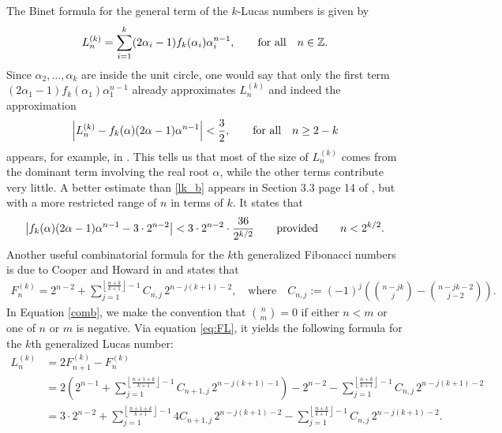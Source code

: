 \documentclass[11pt,a4paper]{article}
\numberwithin{equation}{section}
\numberwithin{table}{section}
\numberwithin{figure}{section}
\begin{document}
The Binet formula for the general term of the $k$-Lucas numbers is given by
\begin{equation*}
L_n^{(k)} = \sum_{i=1}^k (2\alpha_i - 1)f_k(\alpha_i)\alpha_i^{n - 1},\qquad {\text{\rm for all}}\quad n\in {\mathbb Z}.
\end{equation*}
Since $\alpha_2,\ldots,\alpha_k$ are inside the unit circle, one would say that only the first term $(2\alpha_1-1)f_k(\alpha_1)\alpha_1^{n-1}$ already approximates $L_n^{(k)}$ and indeed the approximation
\begin{align}\label{lk_b}
\left|L_n^{(k)} - f_k(\alpha)(2\alpha - 1)\alpha^{n - 1}\right| < \frac{3}{2},\qquad {\text{\rm for~all}}\quad n\ge 2-k
\end{align}
appears, for example, in \cite{BRL}. This tells us that most of the size of $L_n^{(k)}$ comes from the dominant term involving the real root $\alpha$, while the other terms contribute very little. A better estimate than \eqref{lk_b} appears in Section  3.3 page 14 of \cite{bat}, but with a more restricted range of $n$ in terms of $k$. It states that 
\begin{align}\label{lk_b1}
	\left| f_k(\alpha)(2\alpha - 1)\alpha^{n - 1}-3\cdot 2^{n-2}\right| < 3\cdot 2^{n-2}\cdot \frac{36}{2^{k/2}}\qquad {\text{\rm provided}}\qquad n<2^{k/2}.
\end{align}
Another useful combinatorial formula for the $k$th generalized Fibonacci numbers is  due to Cooper and Howard in \cite{cop} and states that
\begin{align}\label{comb}
F_n^{(k)} = 2^{n - 2} + \sum_{j = 1}^{\left\lfloor \frac{n + k}{k + 1} \right\rfloor - 1} C_{n, j} \, 2^{n - j(k+1) - 2}, \quad \text{where} \quad 
C_{n,j} := (-1)^j \left( \binom{n - jk}{j} - \binom{n - jk - 2}{j - 2} \right).
\end{align}
In Equation \eqref{comb}, we make the convention that $\displaystyle\binom{n}{m}=0$ if either $n<m$ or one of $n$ or $m$ is negative.
Via equation \eqref{eq:FL}, it yields the following formula for the $k$th generalized Lucas number:
 \begin{align}\label{2adic2}
	L_n^{(k)} &= 2F_{n+1}^{(k)}-F_n^{(k)}\nonumber\\
	&= 2\left(2^{n-1}+
	\sum_{j = 1}^{\left\lfloor \frac{n +1+ k}{k + 1} \right\rfloor - 1} C_{n+1, j} \, 2^{n - j(k+1) - 1}\right)-
	2^{n - 2} - \sum_{j = 1}^{\left\lfloor \frac{n + k}{k + 1} \right\rfloor - 1} C_{n, j} \, 2^{n - j(k+1) - 2}\nonumber\\
	&= 3\cdot2^{n-2}+
	\sum_{j = 1}^{\left\lfloor \frac{n +1+ k}{k + 1} \right\rfloor - 1}4 C_{n+1, j} \, 2^{n - j(k+1) -2}
	- \sum_{j = 1}^{\left\lfloor \frac{n + k}{k + 1} \right\rfloor - 1} C_{n, j} \, 2^{n - j(k+1) - 2}.
\end{align}
\end{document}
